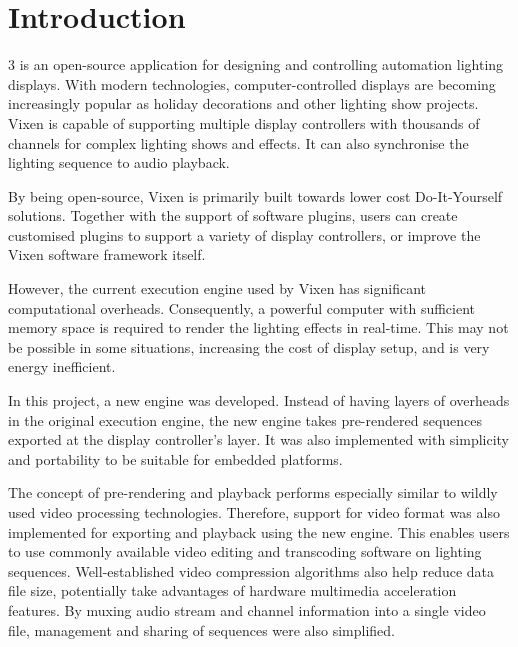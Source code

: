 \chapter{Introduction}
\renewcommand{\baselinestretch}{\mystretch}
\label{chap:Intro}

 3 \cite{vixen} is an open-source application for designing and controlling automation lighting displays. With modern technologies, computer-controlled displays are becoming increasingly popular as holiday decorations and other lighting show projects. Vixen is capable of supporting multiple display controllers with thousands of channels for complex lighting shows and effects. It can also synchronise the lighting sequence to audio playback.

By being open-source, Vixen is primarily built towards lower cost Do-It-Yourself solutions. Together with the support of software plugins, users can create customised plugins to support a variety of display controllers, or improve the Vixen software framework itself.

However, the current execution engine used by Vixen has significant computational overheads. Consequently, a powerful computer with sufficient memory space is required to render the lighting effects in real-time. This may not be possible in some situations, increasing the cost of display setup, and is very energy inefficient.

In this project, a new engine was developed. Instead of having layers of overheads in the original execution engine, the new engine takes pre-rendered sequences exported at the display controller's layer. It was also implemented with simplicity and portability to be suitable for embedded platforms.

The concept of pre-rendering and playback performs especially similar to wildly used video processing technologies. Therefore, support for video format was also implemented for exporting and playback using the new engine. This enables users to use commonly available video editing and transcoding software on lighting sequences. Well-established video compression algorithms also help reduce data file size, potentially take advantages of hardware multimedia acceleration features. By muxing audio stream and channel information into a single video file, management and sharing of sequences were also simplified.
